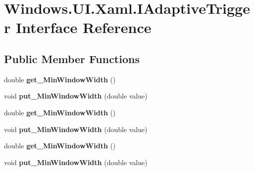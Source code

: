 \hypertarget{interface_windows_1_1_u_i_1_1_xaml_1_1_i_adaptive_trigger}{}\section{Windows.\+U\+I.\+Xaml.\+I\+Adaptive\+Trigger Interface Reference}
\label{interface_windows_1_1_u_i_1_1_xaml_1_1_i_adaptive_trigger}
\subsection*{Public Member Functions}
\begin{DoxyCompactItemize}
\item 
\mbox{\label{interface_windows_1_1_u_i_1_1_xaml_1_1_i_adaptive_trigger_a1e216a296607bc714b8ec9160bed0c09}} 
double {\bfseries get\+\_\+\+Min\+Window\+Width} ()
\item 
\mbox{\label{interface_windows_1_1_u_i_1_1_xaml_1_1_i_adaptive_trigger_aba26990e4c1675dc1ec8fd9e58c8e01c}} 
void {\bfseries put\+\_\+\+Min\+Window\+Width} (double value)
\item 
\mbox{\label{interface_windows_1_1_u_i_1_1_xaml_1_1_i_adaptive_trigger_a1e216a296607bc714b8ec9160bed0c09}} 
double {\bfseries get\+\_\+\+Min\+Window\+Width} ()
\item 
\mbox{\label{interface_windows_1_1_u_i_1_1_xaml_1_1_i_adaptive_trigger_aba26990e4c1675dc1ec8fd9e58c8e01c}} 
void {\bfseries put\+\_\+\+Min\+Window\+Width} (double value)
\item 
\mbox{\label{interface_windows_1_1_u_i_1_1_xaml_1_1_i_adaptive_trigger_a1e216a296607bc714b8ec9160bed0c09}} 
double {\bfseries get\+\_\+\+Min\+Window\+Width} ()
\item 
\mbox{\label{interface_windows_1_1_u_i_1_1_xaml_1_1_i_adaptive_trigger_aba26990e4c1675dc1ec8fd9e58c8e01c}} 
void {\bfseries put\+\_\+\+Min\+Window\+Width} (double value)

\end{DoxyCompactItemize}
